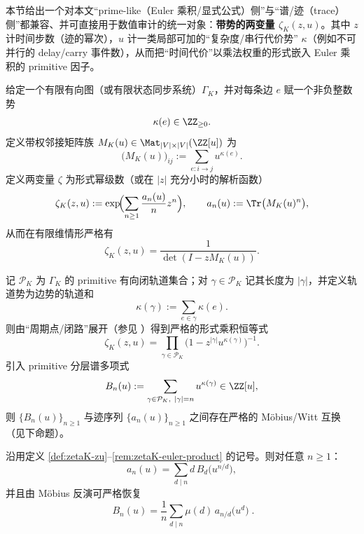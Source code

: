 本节给出一个对本文“prime-like（Euler 乘积/显式公式）侧”与“谱/迹（trace）侧”都兼容、并可直接用于数值审计的统一对象：\textbf{带势的两变量 \(\zeta_K(z,u)\)}。其中 \(z\) 计时间步数（迹的幂次），\(u\) 计一类局部可加的“复杂度/串行代价势” \(\kappa\)（例如不可并行的 delay/carry 事件数），从而把“时间代价”以乘法权重的形式嵌入 Euler 乘积的 primitive 因子。

\begin{definition}\label{def:zetaK-zu}
给定一个有限有向图（或有限状态同步系统）\(\Gamma_K\)，并对每条边 \(e\) 赋一个非负整数势
\[
\kappa(e)\in\ZZ_{\ge 0}.
\]
定义带权邻接矩阵族 \(M_K(u)\in \Mat_{|V|\times |V|}(\ZZ[u])\) 为
\[
\bigl(M_K(u)\bigr)_{ij}:=\sum_{e:i\to j} u^{\kappa(e)}.
\]
定义两变量 \(\zeta\) 为形式幂级数（或在 \(|z|\) 充分小时的解析函数）
\begin{equation}\label{eq:zetaK-trace-exp}
\zeta_K(z,u)
:=\exp\!\Bigl(\sum_{n\ge 1}\frac{a_n(u)}{n}z^n\Bigr),
\qquad
a_n(u):=\Tr\bigl(M_K(u)^n\bigr),
\end{equation}
从而在有限维情形严格有
\begin{equation}\label{eq:zetaK-det}
\zeta_K(z,u)=\frac{1}{\det(I-zM_K(u))}.
\end{equation}
\end{definition}

\begin{remark}\label{rem:zetaK-euler-product}
记 \(\mathcal{P}_K\) 为 \(\Gamma_K\) 的 primitive 有向闭轨道集合；对 \(\gamma\in\mathcal{P}_K\) 记其长度为 \(|\gamma|\)，并定义轨道势为边势的轨道和
\[
\kappa(\gamma):=\sum_{e\in\gamma}\kappa(e).
\]
则由“周期点/闭路”展开（参见 \cite{ParryPollicott1990Zeta,LindMarcus1995}）得到严格的形式乘积恒等式
\begin{equation}\label{eq:zetaK-euler}
\zeta_K(z,u)=\prod_{\gamma\in\mathcal{P}_K}\bigl(1-z^{|\gamma|}u^{\kappa(\gamma)}\bigr)^{-1}.
\end{equation}
引入 primitive 分层谱多项式
\begin{equation}\label{eq:zetaK-Bn}
B_n(u):=\sum_{\gamma\in\mathcal{P}_K,\ |\gamma|=n} u^{\kappa(\gamma)}\in\ZZ[u],
\end{equation}
则 \(\{B_n(u)\}_{n\ge 1}\) 与迹序列 \(\{a_n(u)\}_{n\ge 1}\) 之间存在严格的 Möbius/Witt 互换（见下命题）。
\end{remark}

\begin{proposition}\label{prop:zetaK-mobius-primitive}
沿用定义 \ref{def:zetaK-zu}--\ref{rem:zetaK-euler-product} 的记号。则对任意 \(n\ge 1\)：
\begin{equation}\label{eq:zetaK-trace-from-primitive}
a_n(u)=\sum_{d\mid n} d\,B_d\!\bigl(u^{n/d}\bigr),
\end{equation}
并且由 Möbius 反演可严格恢复
\begin{equation}\label{eq:zetaK-primitive-from-trace}
\boxed{\;
B_n(u)=\frac{1}{n}\sum_{d\mid n}\mu(d)\,a_{n/d}\!\bigl(u^{d}\bigr)\; }.
\end{equation}
\end{proposition}

